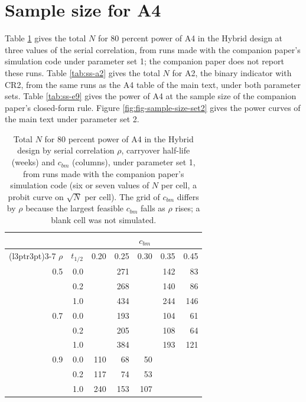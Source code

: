 \documentclass[
  11pt,
]{article}
\begin{document}
\section{Sample size for A4}\label{sample-size-for-a4}

Table \ref{tab:ss-rho} gives the total \(N\) for 80 percent power of A4
in the Hybrid design at three values of the serial correlation, from
runs made with the companion paper's simulation code under
parameter set 1; the companion paper does not report these runs. Table
\ref{tab:ss-a2} gives the total \(N\) for A2, the binary indicator with
CR2, from the same runs as the A4 table of the main text, under both
parameter sets. Table
\ref{tab:ss-e9} gives the power of A4 at the sample size of the
companion paper's closed-form rule. Figure
\ref{fig:fig-sample-size-set2} gives the power curves of the
main text under parameter set 2.

\begin{table}
\centering
\caption{\label{tab:ss-rho}Total $N$ for 80 percent power of A4 in the Hybrid design
    by serial correlation $\rho$, carryover half-life (weeks) and
    $c_{bm}$ (columns), under parameter set 1, from runs made with
    the companion paper's simulation code (six or seven values of $N$
    per cell, a probit curve
    on $\sqrt{N}$ per cell). The grid of $c_{bm}$ differs by $\rho$
    because the largest feasible $c_{bm}$ falls as $\rho$ rises; a
    blank cell was not simulated.}
\centering
\fontsize{9}{11}\selectfont
\begin{tabular}[t]{rrrrrrr}
\toprule
\multicolumn{2}{c}{ } & \multicolumn{5}{c}{$c_{bm}$} \\
\cmidrule(l{3pt}r{3pt}){3-7}
$\rho$ & $t_{1/2}$ & 0.20 & 0.25 & 0.30 & 0.35 & 0.45\\
\midrule
0.5 & 0.0 &  & 271 &  & 142 & 83\\
 & 0.2 &  & 268 &  & 140 & 86\\
 & 1.0 &  & 434 &  & 244 & 146\\
0.7 & 0.0 &  & 193 &  & 104 & 61\\
 & 0.2 &  & 205 &  & 108 & 64\\
 & 1.0 &  & 384 &  & 193 & 121\\
0.9 & 0.0 & 110 & 68 & 50 &  & \\
 & 0.2 & 117 & 74 & 53 &  & \\
 & 1.0 & 240 & 153 & 107 &  & \\
\bottomrule
\end{tabular}
\end{table}
\end{document}
